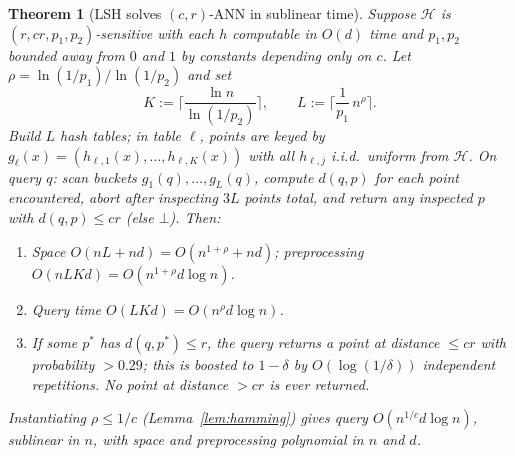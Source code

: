 \documentclass{amsart}
\newtheorem{theorem}{Theorem}
\begin{document}
\begin{theorem}[LSH solves $(c,r)$-ANN in sublinear time]\label{thm:lsh}
Suppose $\mathcal H$ is $(r,cr,p_1,p_2)$-sensitive with each $h$ computable in $O(d)$
time and $p_1,p_2$ bounded away from $0$ and $1$ by constants depending only on $c$.
Let $\rho=\ln(1/p_1)/\ln(1/p_2)$ and set
\[
K:=\Big\lceil \frac{\ln n}{\ln(1/p_2)}\Big\rceil,
\qquad
L:=\Big\lceil \frac{1}{p_1}\,n^{\rho}\Big\rceil .
\]
Build $L$ hash tables; in table $\ell$, points are keyed by
$g_\ell(x)=(h_{\ell,1}(x),\dots,h_{\ell,K}(x))$ with all $h_{\ell,j}$ i.i.d.\ uniform
from $\mathcal H$.  On query $q$: scan buckets $g_1(q),\dots,g_L(q)$, compute $d(q,p)$
for each point encountered, abort after inspecting $3L$ points total, and return any
inspected $p$ with $d(q,p)\le cr$ (else $\bot$).  Then:
\begin{enumerate}
\item[(a)] Space $O(nL+nd)=O(n^{1+\rho}+nd)$; preprocessing $O(nLKd)=
O(n^{1+\rho}d\log n)$.
\item[(b)] Query time $O(LKd)=O(n^{\rho}d\log n)$.
\item[(c)] If some $p^\ast$ has $d(q,p^\ast)\le r$, the query returns a point at
distance $\le cr$ with probability $>0.29$; this is boosted to $1-\delta$ by
$O(\log(1/\delta))$ independent repetitions.  No point at distance $>cr$ is ever
returned.
\end{enumerate}
Instantiating $\rho\le 1/c$ (Lemma~\ref{lem:hamming}) gives query $O(n^{1/c}d\log n)$,
sublinear in $n$, with space and preprocessing polynomial in $n$ and $d$.
\end{theorem}
\end{document}
